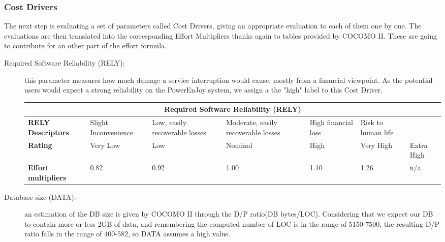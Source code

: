 \subsubsection{Cost Drivers}

The next step is evaluating a set of parameters called Cost Drivers, giving an appropriate evaluation to each of them one by one. The evaluations are then translated into the corresponding Effort Multipliers thanks again to tables provided by COCOMO II. These are going to contribute for an other part of the effort formula.

\begin{description}
\item[Required Software Reliability (RELY):] this parameter measures how much damage a service interruption would cause, mostly from a financial viewpoint. As the potential users would expect a strong reliability on the PowerEnJoy system, we assign a the "high" label to this Cost Driver.

\begin{tabular}{|p{}|p{}|p{}|p{}|p{}|p{}|p{}|}
\hline
         \multicolumn{7}{|c|}{\textbf{Required Software Reliability (RELY)}} \\ \hline  \hline
	\textbf{RELY Descriptors} & Slight Inconvenience & Low, easily recoverable losses & Moderate, easily recoverable losses & High financial loss & Risk to human life& \\ \hline
	\textbf{Rating} & Very Low & Low & Nominal  & High & Very High & Extra High\\ \hline
	\textbf{Effort multipliers} & 0.82 & 0.92 & 1.00 & 1.10 & 1.26 &  n/a \\ \hline
\end{tabular}

\item[Database size (DATA):] an estimation of the DB size is given by COCOMO II through the D/P ratio(DB bytes/LOC). Considering that we expect our DB to contain more or less 2GB of data, and remembering the computed number of LOC is in the range of 5150-7500, the resulting D/P ratio falls in the range of 400-582, so DATA assumes a high value.


\end{description}
